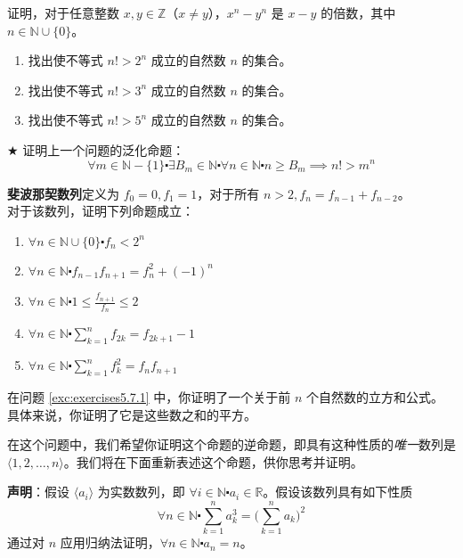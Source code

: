 \begin{exercise}
    证明，对于任意整数 $x,y \in \mathbb{Z}$（$x \ne y$），$x^n-y^n$ 是 $x-y$ 的倍数，其中 $n \in \mathbb{N} \cup \{0\}$。
\end{exercise}

\begin{exercise}
    \begin{enumerate}[label=(\alph*)]
        \item 找出使不等式 $n! > 2^n$ 成立的自然数 $n$ 的集合。
        \item 找出使不等式 $n! > 3^n$ 成立的自然数 $n$ 的集合。
        \item 找出使不等式 $n! > 5^n$ 成立的自然数 $n$ 的集合。
    \end{enumerate}
\end{exercise}

\begin{exercise}
    $\bigstar$ 证明上一个问题的泛化命题：
    \[\forall m \in \mathbb{N} - \{1\} \centerdot \exists B_m \in \mathbb{N} \centerdot \forall n \in \mathbb{N} \centerdot n \ge B_m \implies n! > m^n\]
\end{exercise}

\begin{exercise}
    \textbf{斐波那契数列}定义为 $f_0=0, f_1=1$，对于所有 $n >2, f_n = f_{n-1}+f_{n-2}$。\\
    对于该数列，证明下列命题成立：
    \begin{enumerate}[label=(\alph*)]
        \item $\forall n \in \mathbb{N} \cup \{0\} \centerdot f_n < 2^n$
        \item $\forall n \in \mathbb{N} \centerdot f_{n-1}f_{n+1} = f_n^2+(-1)^n$
        \item $\forall n \in \mathbb{N} \centerdot 1 \le \frac{f_{n+1}}{f_n} \le 2$
        \item $\forall n \in \mathbb{N} \centerdot \sum_{k=1}^{n} f_{2k}= f_{2k+1}-1$
        \item $\forall n \in \mathbb{N} \centerdot \sum_{k=1}^{n} f_k^2= f_{n}f_{n+1}$
    \end{enumerate}
\end{exercise}

\begin{exercise}
    在问题 \ref{exc:exercises5.7.1} 中，你证明了一个关于前 $n$ 个自然数的立方和公式。具体来说，你证明了它是这些数之和的平方。
    
    在这个问题中，我们希望你证明这个命题的逆命题，即具有这种性质的\emph{唯一}数列是 $\langle 1, 2, \dots, n \rangle$。我们将在下面重新表述这个命题，供你思考并证明。

    \textbf{声明}：假设 $\langle a_i \rangle$ 为实数数列，即 $\forall i \in \mathbb{N} \centerdot a_i \in \mathbb{R}$。假设该数列具有如下性质
    \[\forall n \in \mathbb{N} \centerdot \sum_{k=1}^{n} a_k^3 = \bigg(\sum_{k=1}^{n} a_k\bigg)^2\]
    通过对 $n$ 应用归纳法证明，$\forall n \in \mathbb{N} \centerdot a_n = n$。
\end{exercise}

